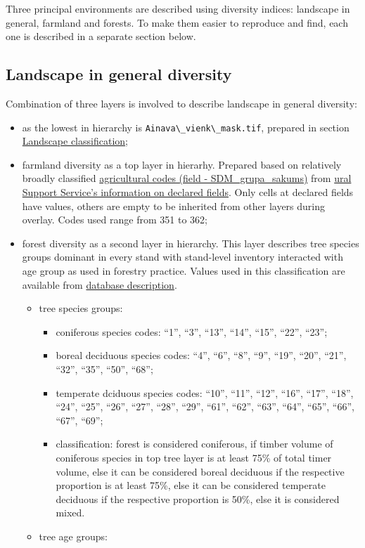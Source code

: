\documentclass[
]{book}
\newcommand{\passthrough}[1]{#1}
\begin{document}
Three principal environments are described using diversity indices: landscape in
general, farmland and forests. To make them easier to reproduce and find, each
one is described in a separate section below.

\subsection{Landscape in general diversity}\label{Ch05.04.01}

Combination of three layers is involved to describe landscape in general diversity:

\begin{itemize}
\item
  as the lowest in hierarchy is \passthrough{\lstinline!Ainava\_vienk\_mask.tif!}, prepared in section
  \hyperref[Ch05.03]{Landscape classification};
\item
  farmland diversity as a top layer in hierarhy. Prepared based on relatively
  broadly classified \href{https://github.com/aavotins/HiQBioDiv_EGVs/blob/main/Data/Geodata/2024/LAD/KulturuKodi_2024.xlsx}{agricultural codes (field - SDM\_grupa\_sakums)} from \hyperref[Ch04.02]{ural Support Service's information on declared fields}. Only cells
  at declared fields have values, others are empty to be inherited from other layers during overlay. Codes used range from 351 to 362;
\item
  forest diversity as a second layer in hierarchy. This layer describes tree
  species groups dominant in every stand with stand-level inventory interacted with
  age group as used in forestry practice. Values used in this classification are
  available from \href{https://www.vmd.gov.lv/lv/meza-valsts-registra-meza-inventarizacijas-failu-struktura}{database description}.

  \begin{itemize}
  \item
    tree species groups:

    \begin{itemize}
    \item
      coniferous species codes: ``1'', ``3'', ``13'', ``14'', ``15'', ``22'', ``23'';
    \item
      boreal deciduous species codes: ``4'', ``6'', ``8'', ``9'', ``19'', ``20'', ``21'',
      ``32'', ``35'', ``50'', ``68'';
    \item
      temperate dciduous species codes: ``10'', ``11'', ``12'', ``16'', ``17'', ``18'',
      ``24'', ``25'', ``26'', ``27'', ``28'', ``29'', ``61'', ``62'', ``63'', ``64'', ``65'', ``66'',
      ``67'', ``69'';
    \item
      classification: forest is considered coniferous, if timber volume of coniferous species in top tree layer is at least 75\% of total timer volume, else it can be considered boreal deciduous if the respective proportion is at least 75\%, else it can be considered temperate deciduous if the respective proportion is 50\%, else it is considered mixed.
    \end{itemize}
  \item
    tree age groups:


\end{itemize}
\end{itemize}
\end{document}
